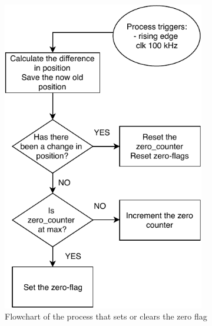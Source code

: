 \documentclass[../../main.tex]{subfiles}
\begin{document}
\begin{figure}[h]
\begin{subfigure}{0.48\textwidth}
    \includegraphics[width = 0.97\textwidth]{Sections/System_Implementation/Images/FPGAProcessSpeedZeroFlowchart.pdf}
    \caption{Flowchart of the process that sets or clears the zero flag}
    \label{subfig:FPGAProcessSpeedZeroFlowchart}
\end{subfigure}\quad
\begin{subfigure}{0.48\textwidth}

\end{subfigure}
\end{figure}
\end{document}
